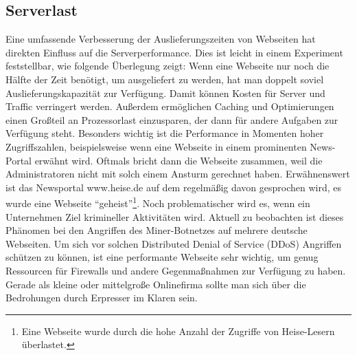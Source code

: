 \subsection{Serverlast}
Eine umfassende Verbesserung der Auslieferungszeiten von Webseiten hat direkten Einfluss auf die Serverperformance. Dies ist leicht in einem Experiment feststellbar, wie folgende Überlegung zeigt: Wenn eine Webseite nur noch die Hälfte der Zeit benötigt, um ausgeliefert zu werden, hat man doppelt soviel Auslieferungskapazität zur Verfügung. Damit k\"onnen Kosten für Server und Traffic verringert werden. Außerdem ermöglichen Caching und Optimierungen einen Großteil an Prozessorlast einzusparen, der dann für andere Aufgaben zur Verfügung steht. Besonders wichtig ist die Performance in Momenten hoher Zugriffszahlen, beispielsweise wenn eine Webseite in einem prominenten News-Portal erwähnt wird. Oftmals bricht dann die Webseite zusammen, weil die Administratoren nicht mit solch einem Ansturm gerechnet haben. Erwähnenswert ist das Newsportal www.heise.de auf dem regelmäßig davon gesprochen wird, es wurde eine Webseite "`geheist"'\footnote{Eine Webseite wurde durch die hohe Anzahl der Zugriffe von Heise-Lesern \"uberlastet.}. Noch problematischer wird es, wenn ein Unternehmen Ziel krimineller Aktivitäten wird. Aktuell zu beobachten ist dieses Phänomen bei den Angriffen des Miner-Botnetzes auf mehrere deutsche Webseiten.\citep{Kaspersky2011} Um sich vor solchen Distributed Denial of Service (DDoS) Angriffen schützen zu können, ist eine performante Webseite sehr wichtig, um genug Ressourcen für Firewalls und andere Gegenmaßnahmen zur Verfügung zu haben. Gerade als kleine oder mittelgro\ss{}e Onlinefirma sollte man sich \"uber die Bedrohungen durch Erpresser im Klaren sein.


